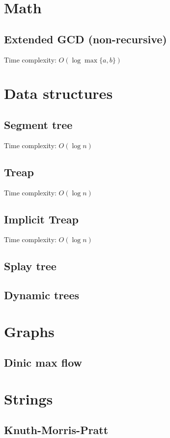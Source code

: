\documentclass[12pt]{article}
\begin{document}
\pagestyle{fancy}
\newpage

\section{Math}
\subsection{Extended GCD (non-recursive)}
Time complexity: $O(\log \max \{a, b\})$


\section{Data structures}
\subsection{Segment tree}
Time complexity: $O(\log n)$
\subsection{Treap}
Time complexity: $O(\log n)$
\subsection{Implicit Treap}
Time complexity: $O(\log n)$
\subsection{Splay tree}
\subsection{Dynamic trees}

\section{Graphs}
\subsection{Dinic max flow}


\section{Strings}
\subsection{Knuth-Morris-Pratt}

\end{document}
